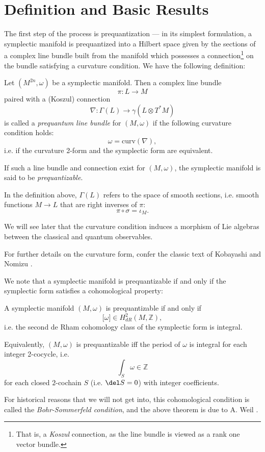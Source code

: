 \section{Definition and Basic Results}
The first step of the process is prequantization --- in its simplest formulation, a symplectic manifold is prequantized into a Hilbert space given by the sections of a complex line bundle built from the manifold which possesses a connection\footnote{That is, a \emph{Koszul} connection, as the line bundle is viewed as a rank one vector bundle.} on the bundle satisfying a curvature condition. We have the following definition:
\begin{defn}
Let $(M^{2n},\omega)$ be a symplectic manifold. Then a complex line bundle
$$
\pi: L \to M
$$
paired with a (Koszul) connection
$$
\nabla: \Gamma(L) \to \gamma(L \otimes T^*M)
$$
is called a \emph{prequantum line bundle} for $(M,\omega)$ if the following curvature condition holds:
$$
\omega = \mathrm{curv}(\nabla),
$$
i.e. if the curvature 2-form and the symplectic form are equivalent.

If such a line bundle and connection exist for $(M,\omega)$, the symplectic manifold is said to be \emph{prequantizable}.
\end{defn}
In the definition above, $\Gamma(L)$ refers to the space of smooth sections, i.e. smooth functions $M \to L$ that are right inverses of $\pi$:
$$
\pi \circ \sigma = \iota_M.
$$

We will see later that the curvature condition induces a morphism of Lie algebras between the classical and quantum observables.

For further details on the curvature form, confer the classic text of Kobayashi and Nomizu \cite{kobayashinomizu}.

We note that a symplectic manifold is prequantizable if and only if the symplectic form satisfies a cohomological property:
\begin{thrm}
A symplectic manifold $(M,\omega)$ is prequantizable if and only if
$$
\biggl[\omega\biggr] \in H_{dR}^2(M,\mathbb{Z}),
$$
i.e. the second de Rham cohomology class of the symplectic form is integral.

Equivalently, $(M,\omega)$ is prequantizable iff the period of $\omega$ is integral for each integer 2-cocycle, i.e.
$$
\int_S \omega \in \mathbb{Z}
$$
for each closed $2$-cochain $S$ (i.e. $\del S = 0$) with integer coefficients.
\end{thrm}
For historical reasons that we will not get into, this cohomological condition is called the \emph{Bohr-Sommerfeld condition}, and the above theorem is due to A. Weil \cite{weil}.


